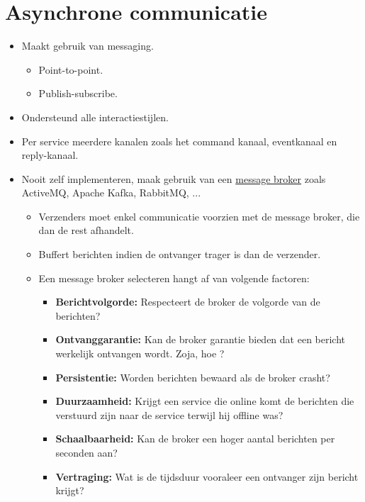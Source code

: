 	\section{Asynchrone communicatie}
	\begin{itemize}
		\item[\info] Maakt gebruik van messaging.
		\begin{itemize}
			\item Point-to-point.
			\item Publish-subscribe.
		\end{itemize}
		\item[\good] Ondersteund alle interactiestijlen.
		\item[\info] Per service meerdere kanalen zoals het command kanaal, eventkanaal en reply-kanaal.
		\item[\info] Nooit zelf implementeren, maak gebruik van een \uline{message broker} zoals ActiveMQ, Apache Kafka, RabbitMQ, ... 
		\begin{itemize}
			\item[\good] Verzenders moet enkel communicatie voorzien met de message broker, die dan de rest afhandelt.
			\item[\good] Buffert berichten indien de ontvanger trager is dan de verzender.
			\item[\good] Een message broker selecteren hangt af van volgende factoren:
			\begin{itemize}
				\item \textbf{Berichtvolgorde:} Respecteert de broker de volgorde van de berichten?
				\item \textbf{Ontvanggarantie:} Kan de broker garantie bieden dat een bericht werkelijk ontvangen wordt. Zoja, hoe ?
				\item \textbf{Persistentie:} Worden berichten bewaard als de broker crasht?
				\item \textbf{Duurzaamheid:} Krijgt een service die online komt de berichten die verstuurd zijn naar de service terwijl hij offline was?
				\item \textbf{Schaalbaarheid:} Kan de broker een hoger aantal berichten per seconden aan?
				\item \textbf{Vertraging:} Wat is de tijdsduur vooraleer een ontvanger zijn bericht krijgt?
			\end{itemize}
		\end{itemize}

	\end{itemize}
